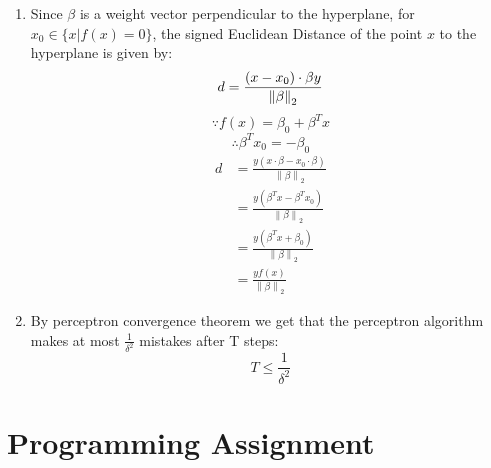\documentclass[11pt, oneside]{article}   	%
\begin{document}
\begin{enumerate}
\item %
  Since $\beta$ is a weight vector perpendicular to the hyperplane,
  for $ x_0 \in \{x|f(x)=0\}$,
  the signed Euclidean Distance of the point $x$ to the hyperplane is given by:
  \[
  d=\frac{(x-x_0) \cdot \beta y} {\left \| \beta \right \|_2}\\
  \]
  \[
  \because f(x)=\beta_0 + \beta^Tx
  \]
  \[
  \therefore \beta^T x_0 = -\beta_0
  \]
  \begin{equation}
    \begin{split}
      d&=\frac{y(x \cdot \beta - x_0 \cdot \beta)} {\left \| \beta \right \|_2}\\
      &=\frac{y(\beta^T x - \beta^T x_0)} {\left \| \beta \right \|_2}\\
      &=\frac{y(\beta^T x + \beta_0)} {\left \| \beta \right \|_2}\\
      &=\frac{yf(x)} {\left \| \beta \right \|_2}
    \end{split}
  \end{equation}

\item
  By perceptron convergence theorem we get that the perceptron algorithm makes at most $\frac{1}{\delta^2}$ mistakes after T steps:
  \[
  T \leq \frac{1}{\delta^2}
  \]
\end{enumerate}


\section{Programming Assignment}
\end{document}
